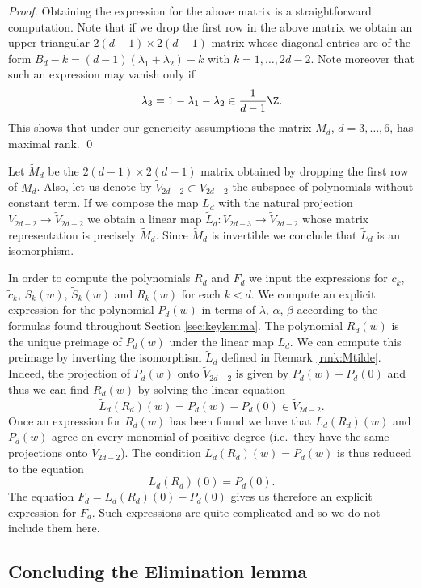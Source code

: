\begin{proof}
Obtaining the expression for the above matrix is a straightforward computation. Note that if we drop the first row in the above matrix we obtain an upper-triangular $2(d-1)\times2(d-1)$ matrix whose diagonal entries are of the form $B_d-k=(d-1)(\lambda_1+\lambda_2)-k$ with $k=1,\ldots,2d-2$. Note moreover that such an expression may vanish only if
\[ \lambda_3=1-\lambda_1-\lambda_2\in\frac{1}{d-1}\Z. \]
This shows that under our genericity assumptions the matrix $M_d$, $d=3,\dots,6$, has maximal rank.
\qed\end{proof}

\begin{remark}\label{rmk:Mtilde}
Let $\tilde{M}_d$ be the $2(d-1)\times2(d-1)$ matrix obtained by dropping the first row of $M_d$. Also, let us denote by $\tilde{V}_{2d-2}\subset V_{2d-2}$ the subspace of polynomials without constant term. If we compose the map $L_d$ with the natural projection $V_{2d-2}\to \tilde{V}_{2d-2}$ we obtain a linear map $\tilde{L}_d\colon V_{2d-3}\to\tilde{V}_{2d-2}$ whose matrix representation is precisely $\tilde{M}_d$. Since $\tilde{M}_d$ is invertible we conclude that $\tilde{L}_d$ is an isomorphism.
\end{remark}

In order to compute the polynomials $R_d$ and $F_d$ we input the expressions for $c_k$, $\tilde{c}_k$, $S_k(w)$, $\widetilde{S}_k(w)$ and $R_k(w)$ for each $k<d$. We compute an explicit expression for the polynomial $P_d(w)$ in terms of $\lambda$, $\alpha$, $\beta$ according to the formulas found throughout Section \ref{sec:keylemma}. The polynomial $R_d(w)$ is the unique preimage of $P_d(w)$ under the linear map $L_d$. We can compute this preimage by inverting the isomorphism $\tilde{L}_d$ defined in Remark \ref{rmk:Mtilde}. Indeed, the projection of $P_d(w)$ onto $\tilde{V}_{2d-2}$ is given by $P_d(w)-P_d(0)$ and thus we can find $R_d(w)$ by solving the linear equation
\[ \tilde{L}_d(R_d)(w)=P_d(w)-P_d(0)\in\tilde{V}_{2d-2}. \]
Once an expression for $R_d(w)$ has been found we have that $L_d(R_d)(w)$ and $P_d(w)$ agree on every monomial of positive degree (i.e.~they have the same projections onto $\tilde{V}_{2d-2}$). The condition $L_d(R_d)(w)=P_d(w)$ is thus reduced to the equation
\[ L_d(R_d)(0)=P_d(0). \]
The equation $F_d=L_d(R_d)(0)-P_d(0)$ gives us therefore an explicit expression for $F_d$. Such expressions are quite complicated and so we do not include them here.


\subsection{Concluding the Elimination lemma}\label{subsec:concludingelimination}

